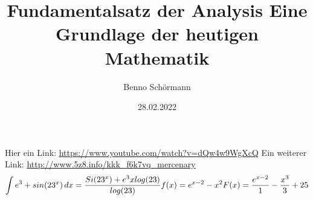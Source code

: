 \documentclass[12pt,a4paper,draft]{article}
\begin{document}
\title{Fundamentalsatz der Analysis\newline
\newline Eine Grundlage der heutigen Mathematik}
\author{Benno Schörmann}
\date{28.02.2022}
\maketitle
Hier ein Link: \url{https://www.youtube.com/watch?v=dQw4w9WgXcQ} \newline
Ein weiterer Link: \url{http://www.5z8.info/kkk_f6k7vq_mercenary}
\begin{equation}
	\int {e}^{3}+sin({23}^{x}) \,dx = \frac{Si({23}^{x})+{e}^{3}xlog(23)}{log(23)}\newline
	f(x)={e}^{x-2}-{x}^{2}\newline
	F(x)=\frac{{e}^{x-2}}{1}-\frac{{x}^{3}}{3}+25\newline
\end{equation}
\end{document}
